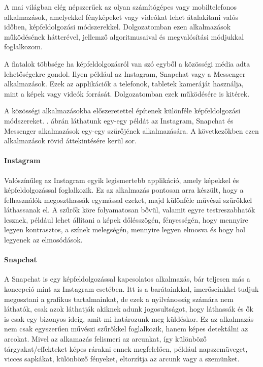 

A mai világban elég népszerűek az olyan számítógépes vagy mobiltelefonos alkalmazások, amelyekkel fényképeket vagy videókat lehet átalakítani valós időben, képfeldolgozási módszerekkel. Dolgozatomban ezen alkalmazások működésének hátterével, jellemző algoritmusaival és megvalósítási módjukkal foglalkozom.


A fiatalok többsége ha képfeldolgozásról van szó egyből a közösségi média adta lehetőségekre gondol. Ilyen például az Instagram, Snapchat vagy a Messenger alkalmazások. Ezek az applikációk a telefonok, tabletek kameráját használja, mint a képek vagy videók forrását. Dolgozatomban ezek működésére is kitérek.


A közösségi alkalmazásokba előszeretettel építenek különféle képfeldolgozási módszereket. . ábrán láthatunk egy-egy példát az Instagram, Snapchat és Messenger alkalmazások egy-egy szűrőjének alkalmazására. A következőkben ezen alkalmazások rövid áttekintésére kerül sor.

\paragraph{Instagram} 

Valószínűleg az Instagram egyik legismertebb applikáció, amely képekkel és képfeldolgozással foglalkozik. Ez az alkalmazás pontosan arra készült, hogy a felhasználók megoszthassák egymással  ezeket, majd különféle művészi szűrőkkel láthassanak el. A szűrők köre folyamatosan bővül, valamit egyre testreszabhatók lesznek, például lehet állítani a képek dőlésszögén, fényességén, hogy mennyire legyen kontrasztos, a színek melegségén, mennyire legyen elmosva és hogy hol legyenek az elmosódások.

\paragraph{Snapchat} 

A Snapchat is egy képfeldolgozással kapcsolatos alkalmazás, bár teljesen más a koncepció mint az Instagram esetében. Itt is a barátainkkal, imerőseinkkel tudjuk megosztani a grafikus tartalmainkat, de ezek a nyilvánosság számára nem láthatók, csak azok láthatják akiknek adunk jogosultságot, hogy láthassák és ők is csak egy bizonyos ideig, amit mi határozunk meg küldéskor. Ez az alkalmazás nem csak egyszerűen művészi szűrőkkel foglalkozik, hanem képes detektálni az arcokat. Mivel az alkamazás felismeri az arcunkat, így különböző tárgyakat/effekteket képes rárakni ennek megfelelően, például napszemüveget, vicces sapkákat,  különböző fényeket, eltorzítja az arcunk vagy a szemünket.

